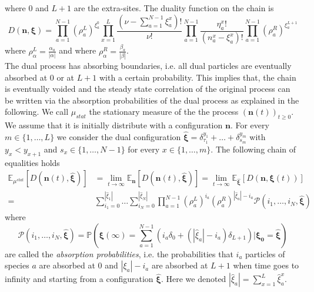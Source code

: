 \documentclass[10pt]{article}
\numberwithin{equation}{section}
\numberwithin{equation}{subsection}
\begin{document}
where $0$ and $L+1$ are the extra-sites. The duality function on the chain is
\begin{equation}\label{dualityFunctionChain}
	D(\bm{n},\bm{\xi})=\prod_{a=1}^{N-1}\left(\rho_{a}^{L}\right)^{\xi_{a}^{0}}\prod_{x=1}^{L}\frac{(\nu-\sum_{a=1}^{N-1}\xi_{a}^{x})!}{\nu!}\prod_{a=1}^{N-1}\frac{\eta_{a}^{x}!}{(n_{a}^{x}-\xi_{a}^{x})!}\prod_{a=1}^{N-1}\left(\rho_{a}^{R}\right)^{\xi_{a}^{L+1}}
\end{equation}
where $\rho_{\alpha}^{L}=\frac{\alpha_{a}}{|\alpha|}$ and where $\rho_{\alpha}^{R}=\frac{\beta_{a}}{|\beta|}$.\\
The dual process has absorbing boundaries, i.e. all dual particles are eventually absorbed at $0$ or at $L+1$ with a certain probability. This implies that, the chain is eventually voided and the steady state correlation of the original process can be written via the absorption probabilities of the dual process as explained in the following. 
We call $\mu_{stat}$ the stationary measure of the the process $(\bm{n}(t))_{t\geq 0}$. We assume that it is initially distribute with a configuration $\bm{n}$. For every $m\in\{1,\ldots,L\}$ we consider the dual configuration  $\bm{\widehat{\xi}}=\delta_{\tau_{1}}^{y_{1}}+\ldots+\delta_{s_{m}}^{y_{m}}$ with $y_{x}<y_{x+1}$  and $s_{x}\in \{1,\ldots,N-1\}$ for every $x\in \{1,\ldots,m\}$. The following chain of equalities holds
\begin{equation}\label{ExptationSS}
	\begin{split}
		\mathbb{E}_{\mu^{stat}}\left[D(\bm{n}(t),\hat{\bm{\xi}})\right]&=\lim_{t\to\infty}\mathbb{E}_{\bm{n}}\left[D(\bm{n}(t),\hat{\bm{\xi}})\right]=\lim_{t\to\infty}\mathbb{E}_{\hat{\bm{\xi}}}\left[D(\bm{n},\bm{\xi}(t))\right]
		\\=&
		\sum_{i_{1}=0}^{|\hat{\xi}_{1}|}\ldots\sum_{i_{N}=0}^{|\hat{\xi}_{N}|}\prod_{a=1}^{N-1}\left(\rho_{a}^{L}\right)^{i_{a}}\left(\rho_{a}^{R}\right)^{|\hat{\xi}_{a}|-i_{a}}\mathcal{P}(i_{1},\ldots,i_{N},\hat{\bm{\xi}})
	\end{split}
\end{equation}
where 
\begin{equation}\label{Pass}
\mathcal{P}(i_{1},\ldots,i_{N},\hat{\bm{\xi}})	=\mathbb{P}\left(\bm{\xi}(\infty)=\sum_{a=1}^{N-1}\left(i_{a}\delta_{0}+(|\hat{\xi}_{a}|-i_{a})\delta_{L+1}\right)| \bm{\xi_{0}}=\hat{\bm{\xi}}\right)
\end{equation}
 are called the \textit{absorption probabilities}, i.e. the probabilities that $i_{a}$ particles of species $a$ are absorbed at $0$ and $|\xi_{a}|-i_{a}$ are absorbed at $L+1$ when time goes to infinity and starting from a configuration $\hat{\bm{\xi}}$. Here we denoted $|\hat{\xi}_{a}|=\sum_{x=1}^{L}\hat{\xi}_{a}^{x}$.
\end{document}
